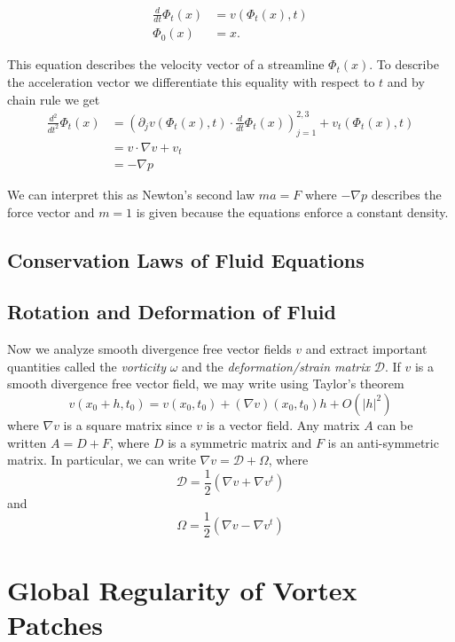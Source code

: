 \[ 
\begin{aligned}
\frac{d}{dt}\Phi_t(x) &= v(\Phi_t(x), t) \\
\Phi_0(x) &= x.
\end{aligned}
\]

This equation describes the velocity vector of a streamline $\Phi_t(x)$. To describe the acceleration vector we differentiate this equality with respect to $t$ and by chain rule we get
\[\begin{aligned}
    \frac{d^2}{dt^2}\Phi_t(x) &= \left(\partial_jv(\Phi_t(x), t)\cdot \frac{d}{dt}\Phi_t(x)\right)_{j = 1}^{2,3} + v_t(\Phi_t(x), t) \\
    &= v \cdot \nabla v + v_t \\
    &= -\nabla p
\end{aligned}\]

We can interpret this as Newton's second law $ma = F$ where $-\nabla p$ describes the force vector and $m = 1$ is given because the equations enforce a constant density.

\section{Conservation Laws of Fluid Equations}



\section{Rotation and Deformation of Fluid}

Now we analyze smooth divergence free vector fields $v$ and extract important quantities called the \textit{vorticity} $\omega$ and the \textit{deformation/strain matrix} $\mathcal{D}$. If $v$ is a smooth divergence free vector field, we may write using Taylor's theorem
\[v(x_0 + h, t_0) = v(x_0, t_0) + (\nabla v)(x_0, t_0)h + O(|h|^2)\]
where $\nabla v$ is a square matrix since $v$ is a vector field. Any matrix $A$ can be written $A = D + F$, where $D$ is a symmetric matrix and $F$ is an anti-symmetric matrix. In particular, we can write $\nabla v = \mathcal{D} + \Omega$, where
\begin{equation}
    \mathcal{D} = \frac{1}{2}(\nabla v + \nabla v^t)
\end{equation}
and 
\begin{equation}
    \Omega = \frac{1}{2}(\nabla v - \nabla v^t)
\end{equation}

\chapter{Global Regularity of Vortex Patches}

